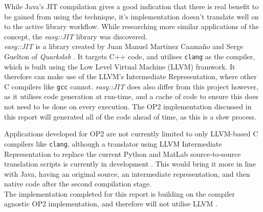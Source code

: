 While Java's JIT compilation gives a good indication that there is real benefit to be gained from using the technique, it's implementation doesn't translate well on to the active library workflow. While researching more similar applications of the concept, the \textit{easy::JIT} library was discovered.\\
\hspace{\parindent} \textit{easy::JIT} \cite{eJIT} is a library created by Juan Manuel Martinez Caamaño and Serge Guelton of \textit{Quarkslab} \cite{Quarkslab}. It targets C++ code, and utilises \verb|clang| \cite{clang} as the compiler, which is built using the Low Level Virtual Machine (LLVM) framwork. It therefore can make use of the LLVM's Intermediate Representation, where other C compilers like \verb|gcc| cannot. \textit{easy::JIT} does also differ from this project however, as it utilises code generation at run-time, and a cache of code to ensure this does not need to be done on every execution. The OP2 implementation discussed in this report will generated all of the code ahead of time, as this is a slow process.
\par
Applications developed for OP2 are not currently limited to only LLVM-based C compilers like \verb|clang|, although a translator using LLVM Intermediate Representation to replace the current Python and MatLab source-to-source translation scripts is currently in development \cite{op2clang}. This would bring it more in line with Java, having an original source, an intermediate representation, and then native code after the second compilation stage.\\
The implementation completed for this report is building on the compiler agnostic OP2 implementation, and therefore will not utilise LLVM .
